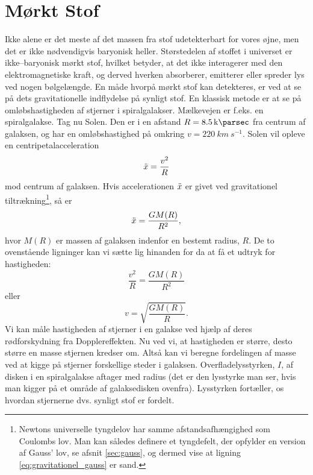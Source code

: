 \section{Mørkt Stof} \label{DM}

Ikke alene er det meste af det massen fra stof udetekterbart for vores øjne, men det er ikke nødvendigvis baryonisk heller. Størstedelen af stoffet i universet er ikke--baryonisk mørkt stof, hvilket betyder, at det ikke interagerer med den elektromagnetiske kraft, og derved hverken absorberer, emitterer eller spreder lys ved nogen bølgelængde. En måde hvorpå mørkt stof kan detekteres, er ved at se på dets gravitationelle indflydelse på synligt stof. En klassisk metode er at se på omløbshastigheden af stjerner i spiralgalakser. Mælkevejen er f.eks. en spiralgalakse. Tag nu Solen. Den er i en afstand $R=\SI{8.5}{\kilo\parsec}$ fra centrum af galaksen, og har en omløbshastighed på omkring $v=\SI{220}{km~s^{-1}}$. Solen vil opleve en centripetalacceleration
\begin{equation}
\Ddot{x} = \frac{v^2}{R} 
\end{equation}
mod centrum af galaksen. Hvis accelerationen $\Ddot{x}$ er givet ved gravitationel tiltrækning\footnote{Newtons universelle tyngdelov har samme afstandsafhængighed som Coulombs lov. Man kan således definere et tyngdefelt, der opfylder en version af Gauss' lov, se afsnit \ref{sec:gauss}, og dermed vise at ligning \eqref{eq:gravitationel_gauss} er sand.}, så er
\begin{equation} \label{eq:gravitationel_gauss}
\Ddot{x} = \frac{G M(R)}{R^2},
\end{equation}
hvor $M(R)$ er massen af galaksen indenfor en bestemt radius, $R$. De to ovenstående ligninger kan vi sætte lig hinanden for da at få et udtryk for hastigheden:
\begin{equation}
\frac{v^2}{R} = \frac{G M(R)}{R^2}
\end{equation}
eller
\begin{equation} \label{eq:fart_i_galakse}
v = \sqrt{\frac{G M(R)}{R}}.
\end{equation}
Vi kan måle hastigheden af stjerner i en galakse ved hjælp af deres rødforskydning fra Dopplereffekten. Nu ved vi, at hastigheden er større, desto større en masse stjernen kredser om. Altså kan vi beregne fordelingen af masse ved at kigge på stjerner forskellige steder i galaksen. Overfladelysstyrken, $I$, af disken i en spiralgalakse aftager med radius (det er den lysstyrke man ser, hvis man kigger på et område af galaksedisken ovenfra). Lysstyrken fortæller, os hvordan stjernerne dvs. synligt stof er fordelt.

